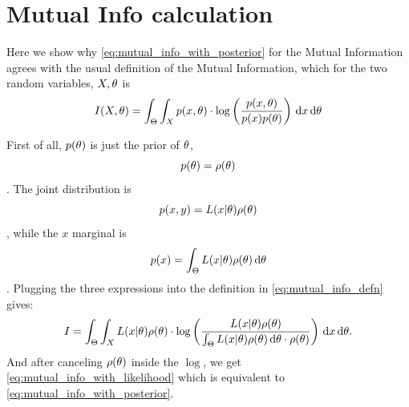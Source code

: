 \documentclass{article}
\begin{document}
\clearpage











\clearpage
\appendix
\section{Mutual Info calculation}
\label{sec:mutual_info_defn} 
Here we show why \cref{eq:mutual_info_with_posterior} for
the Mutual Information agrees with the usual definition of the Mutual Information, which
for the two random variables, $X,{\theta}$ is
\begin{equation}
I(X,{\theta}) = \int_\Theta \int_X p(x,{\theta}) \cdot \log \left(
\frac{p(x,{\theta})}{p(x)p({\theta})}\right) \, \mathrm{d} x \, \mathrm{d} {\theta}
\label{eq:mutual_info_defn}
\end{equation}

First of all, $p({\theta})$  is just the prior of ${\theta}$, $$p({\theta}) = \rho({\theta})$$.
The joint distribution is $$p(x,y) = L(x|{\theta})\rho({\theta})$$, while the $x$
marginal is $$p(x) = \int_\Theta L(x|{\theta})\rho({\theta}) \, \mathrm{d} {\theta}$$.
Plugging the three expressions into the definition in
\cref{eq:mutual_info_defn} gives:
\begin{equation}
I = \int_\Theta \int_X L(x|{\theta})\rho({\theta}) \cdot 
\log \left( \frac{L(x|{\theta})\rho({\theta}) }{\int_\Theta L(x|{\theta})\rho({\theta}) \, \mathrm{d} {\theta}
\cdot \rho({\theta}) } \right)
\, \mathrm{d} x\, \mathrm{d} {\theta}.
\label{eq:mutual_info_prior_trajectory}
\end{equation}
And after canceling $\rho({\theta})$ inside the $\log$, we get
\cref{eq:mutual_info_with_likelihood} which is equivalent to
\cref{eq:mutual_info_with_posterior}.




 

\end{document}
